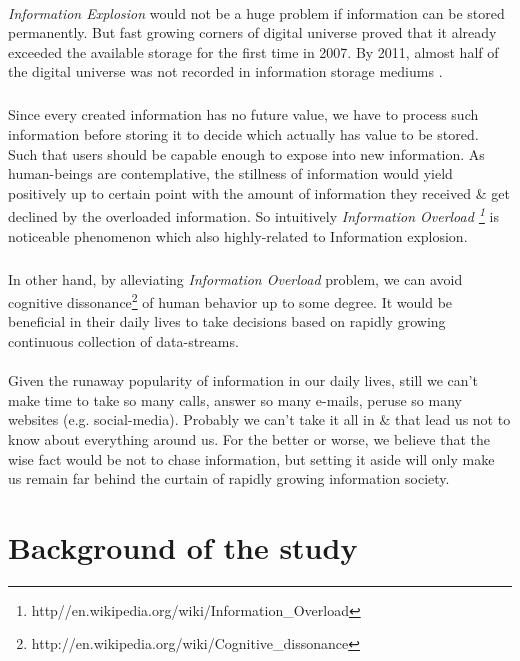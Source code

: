 \documentclass[a4paper,12pt,oneside]{book}
\theoremstyle{definition}
\theoremstyle{remark}
\begin{document}
\paragraph*{}
\emph{Information Explosion} would not be a huge problem if information can be stored permanently. But fast growing corners of digital universe proved that it already exceeded the available storage for the first time in 2007. By 2011, almost half of the digital universe was not recorded in information storage mediums \cite{Gantz2011}.
\subparagraph*{}
Since every created information has no future value, we have to process such information before storing it to decide which actually has value to be stored. Such that users should be capable enough to expose into new information. As human-beings are contemplative, the stillness of information would yield positively up to certain point with the amount of information they received \& get declined by the overloaded information. So intuitively \emph{Information Overload \footnote{http//en.wikipedia.org/wiki/Information\_Overload}} is noticeable phenomenon which also highly-related to Information explosion. 
\subparagraph*{}
In other hand, by alleviating \emph{Information Overload} problem, we can avoid cognitive dissonance\footnote{http://en.wikipedia.org/wiki/Cognitive\_dissonance} of human behavior up to some degree. It would be beneficial in their daily lives to take decisions based on rapidly growing continuous
collection of data-streams.
\paragraph*{}
Given the runaway popularity of information in our daily lives, still we can't make time to take so many calls, answer so many e-mails, peruse so many websites (e.g. social-media). Probably we can't take it all in \& that lead us not to know about everything around us. For the better or worse, we believe that the wise fact would be not to chase information, but setting it aside will only make us remain far behind the curtain of rapidly growing information society. 

\section{Background of the study}
\end{document}
